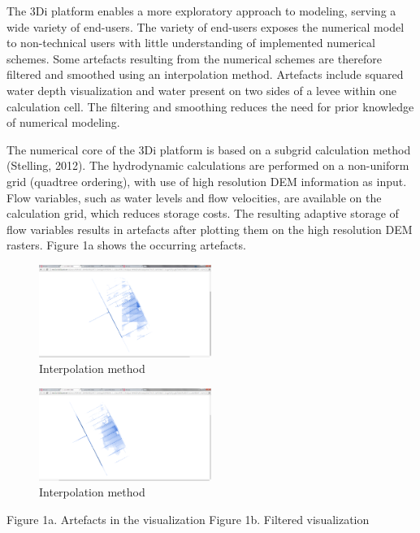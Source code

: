 \documentclass[a4paper]{article}
\begin{document}
The 3Di platform enables a more exploratory approach to modeling, serving a wide variety of end-users. The variety of end-users exposes the numerical model to non-technical users with little understanding of implemented numerical schemes. Some artefacts resulting from the numerical schemes are therefore filtered and smoothed using an interpolation method. Artefacts include squared water depth visualization and water present on two sides of a levee within one calculation cell. The filtering and smoothing reduces the need for prior knowledge of numerical modeling.

The numerical core of the 3Di platform is based on a subgrid calculation method (Stelling, 2012). The hydrodynamic calculations are performed on a non-uniform grid (quadtree ordering), with use of high resolution \ac{DEM} information as input. Flow variables, such as water levels and flow velocities, are available on the calculation grid, which reduces storage costs. The resulting adaptive storage of flow variables results in artefacts after plotting them on the high resolution \ac{DEM} rasters. Figure 1a shows the occurring artefacts.


\begin{figure}[h]
  \centering
  \includegraphics[width=0.5\textwidth]{artifacts_a}
  \caption{Interpolation method}
  \label{fig:artifacts_a}
\end{figure}

\begin{figure}[h]
  \centering
  \includegraphics[width=0.5\textwidth]{artifacts_b}
  \caption{Interpolation method}
  \label{fig:artifacts_b}
\end{figure}

Figure 1a.  Artefacts in the visualization                      Figure 1b.  Filtered visualization
\end{document}
